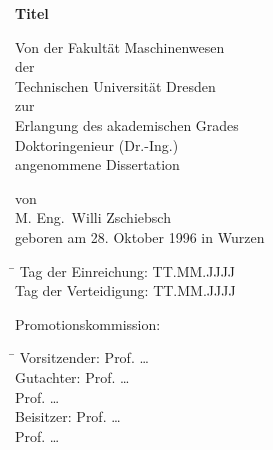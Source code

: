 \begin{titlepage}

\centering
\vspace*{-2.0cm}

{\renewcommand{\baselinestretch}{1.4}\LARGE
{\textbf{Titel}}\par
}

\vspace{1cm}

Von der Fakultät Maschinenwesen \\[+0.5\baselineskip]
der\\[+0.5\baselineskip]
Technischen Universität Dresden \\[+0.5\baselineskip]
zur\\[+0.5\baselineskip]
Erlangung des akademischen Grades \\[+0.5\baselineskip]
Doktoringenieur (Dr.-Ing.) \\[+0.5\baselineskip]
angenommene Dissertation

\vspace{1cm}

von \\[+0.5\baselineskip]
{\large M. Eng.\ Willi Zschiebsch} \\[+0.5\baselineskip]
geboren am 28. Oktober 1996 in Wurzen \\

\vspace{1cm}

\begin{tabbing}
\hspace*{4.3cm}\= \kill
Tag der Einreichung: \> TT.MM.JJJJ \\
Tag der Verteidigung: \> TT.MM.JJJJ 
\end{tabbing}

\vspace{1cm}

\raggedright
Promotionskommission:
\begin{tabbing}
\hspace*{2.8cm}\= \kill
Vorsitzender: \> Prof. \dots \\[+0.5\baselineskip]
Gutachter:    \> Prof. \dots \\
							\> Prof. \dots \\[+0.5\baselineskip]
Beisitzer: 		\> Prof. \dots \\
							\> Prof. \dots \\
\end{tabbing}
\end{titlepage}

